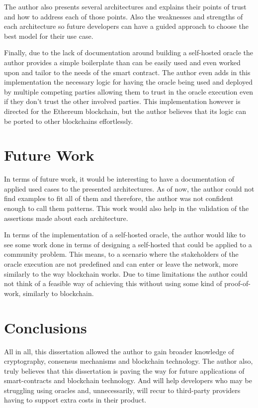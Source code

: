 The author also presents several architectures and explains their points of trust and how to address each of those points. Also the weaknesses and strengths of each architecture so future developers can have a guided approach to choose the best model for their use case.

Finally, due to the lack of documentation around building a self-hosted oracle the author provides a simple boilerplate than can be easily used and even worked upon and tailor to the needs of the smart contract. The author even adds in this implementation the necessary logic for having the oracle being used and deployed by multiple competing parties allowing them to trust in the oracle execution even if they don't trust the other involved parties. This implementation however is directed for the Ethereum blockchain, but the author believes that its logic can be ported to other blockchains effortlessly.

\section{Future Work}

In terms of future work, it would be interesting to have a documentation of applied used cases to the presented architectures. As of now, the author could not find examples to fit all of them and therefore, the author was not confident enough to call them patterns. This work would also help in the validation of the assertions made about each architecture.

In terms of the implementation of a self-hosted oracle, the author would like to see some work done in terms of designing a self-hosted that could be applied to a community problem. This means, to a scenario where the stakeholders of the oracle execution are not predefined and can enter or leave the network, more similarly to the way blockchain works. Due to time limitations the author could not think of a feasible way of achieving this without using some kind of proof-of-work, similarly to blockchain.

\section{Conclusions}

All in all, this dissertation allowed the author to gain broader knowledge of cryptography, consensus mechanisms and blockchain technology. The author also, truly believes that this dissertation is paving the way for future applications of smart-contracts and blockchain technology. And will help developers who may be struggling using oracles and, unnecessarily, will recur to third-party providers having to support extra costs in their product.